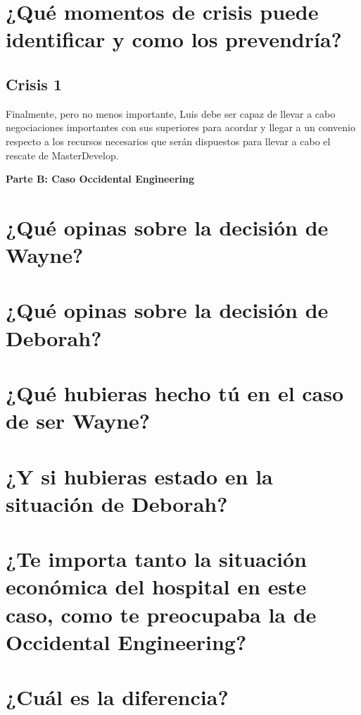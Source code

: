 \documentclass{article}
\newcommand*\rbreak{\par\noindent\linebreak}
\begin{document}
\section{¿Qué momentos de crisis puede identificar y como los
prevendría?}
\subsection{Crisis 1}
Finalmente, pero no menos importante, Luis debe ser capaz 
de llevar a cabo negociaciones importantes con sus superiores
para acordar y llegar a un convenio respecto a los recursos
necesarios que serán dispuestos para llevar a cabo el 
rescate de MasterDevelop. 

\textbf{\huge{Parte B: Caso Occidental Engineering}}\rbreak
\section{¿Qué opinas sobre la decisión de Wayne?}
\section{¿Qué opinas sobre la decisión de Deborah?}
\section{¿Qué hubieras hecho tú en el caso de ser Wayne?}
\section{¿Y si hubieras estado en la situación de Deborah?}
\section{¿Te importa tanto la situación económica del hospital
        en este caso, como te preocupaba la de Occidental
        Engineering?}
\section{¿Cuál es la diferencia?}
\end{document}
